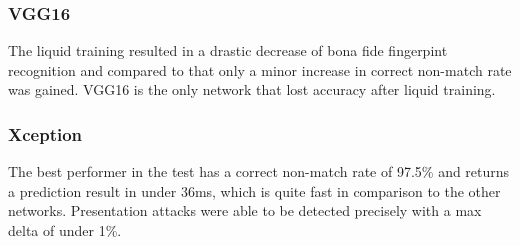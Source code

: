 

\subsubsection{VGG16}
The liquid training resulted in a drastic decrease of bona fide fingerpint recognition and compared to that only a minor increase in correct non-match rate was gained.
VGG16 is the only network that lost accuracy after liquid training.



\subsubsection{Xception}
The best performer in the test has a correct non-match rate of 97.5\% and returns a prediction result in under 36ms, which is quite fast in comparison to the other networks.
Presentation attacks were able to be detected precisely with a max delta of under 1\%.





\endinput





\subsubsection{EfficientNet B0}

The only CMR over 90\% is achieved by EfficientNet B0 which is the second best performer over all.
Bona fide fingerprints were correctly detected with an accuracy of 92.5\%.

\predictiontables{efficientnet}



\medskip
Out of the three tested neural networks MobileNet was performing the best on average thanks to it's high true negative detection rate.
The other two networks however have a better true positive rate.
\bigskip\hrule



\subsection{MobileNet}
Bona fide fingerprints were correctly detected with an accuracy of 89.1\%, while presentation attacks were detected correctly with 93.19\%.
None of the materials show significant variance from each other and are within a range of 92.0\% and 94.7\%.
Liquid Ecoflex shows the worst deception potential.


